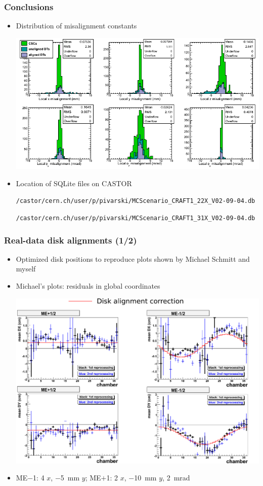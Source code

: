 \documentclass[compress]{beamer}
\begin{document}
\begin{frame}
\frametitle{Conclusions}
\begin{itemize}
\item Distribution of misalignment constants

\includegraphics[width=\linewidth]{mcscenario.png}

\item Location of SQLite files on CASTOR

{\tt \scriptsize /castor/cern.ch/user/p/pivarski/MCScenario\_CRAFT1\_22X\_V02-09-04.db}

{\tt \scriptsize /castor/cern.ch/user/p/pivarski/MCScenario\_CRAFT1\_31X\_V02-09-04.db}
\end{itemize}
\label{numpages}
\end{frame}

\begin{frame}
\frametitle{Real-data disk alignments (1/2)}
\begin{itemize}
\item Optimized disk positions to reproduce plots shown by Michael Schmitt and myself
\item Michael's plots: residuals in global coordinates

\includegraphics[width=0.85\linewidth]{Michaelsplots_globalcoords.pdf}

\item ME$-$1: 4 $x$, $-$5~mm $y$; ME$+$1: 2 $x$, $-$10~mm $y$, 2~mrad
\end{itemize}
\end{frame}
\end{document}
